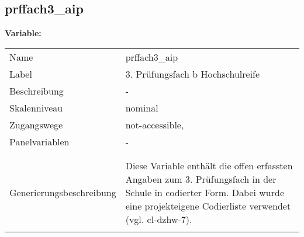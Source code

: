 	
	
	\subsection{prffach3\_aip}
	\label{subSection:prffach3_aip}

	\noindent\textbf{Variable:}\\
		\begin{tabular}{lL{11.3cm}}
			\label{tableVariable:prffach3_aip}
			Name & prffach3\_aip \\
			Label & 3. Prüfungsfach b Hochschulreife \\
			Beschreibung & - \\
			Skalenniveau & nominal \\
			Zugangswege &
				not-accessible,
 \\
			Panelvariablen & -
			 \\
			 \\
 \\
					Generierungsbeschreibung & Diese Variable enthält die offen erfassten Angaben zum 3. Prüfungsfach in der Schule in codierter Form. Dabei wurde eine projekteigene Codierliste verwendet (vgl. cl-dzhw-7).
				 \\	
			 \\
		\end{tabular}






	
	\newpage
